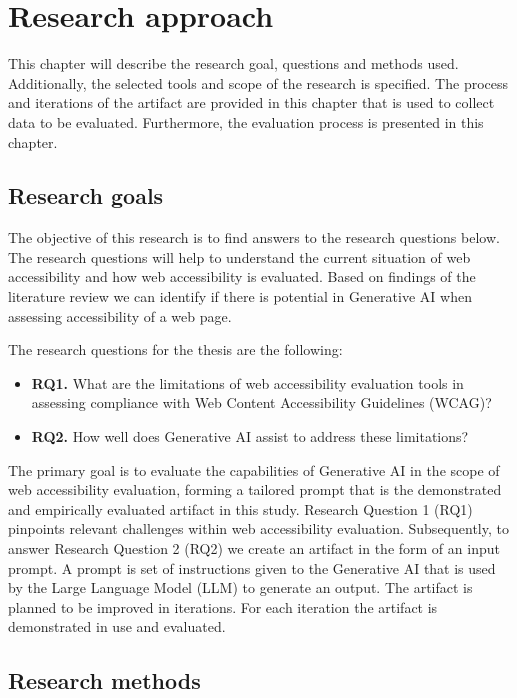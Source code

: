 \chapter{Research approach\label{methods}}

This chapter will describe the research goal, questions and methods used. Additionally, the selected tools and scope of the research is specified. The process and iterations of the artifact are provided in this chapter that is used to collect data to be evaluated. Furthermore, the evaluation process is presented in this chapter.

\section{Research goals}

The objective of this research is to find answers to the research questions below. The research questions will help to understand the current situation of web accessibility and how web accessibility is evaluated. Based on findings of the literature review we can identify if there is potential in Generative AI when assessing accessibility of a web page. 

The research questions for the thesis are the following:

\begin{itemize}
    \item \textbf{RQ1.} What are the limitations of web accessibility evaluation tools in assessing compliance with Web Content Accessibility Guidelines (WCAG)?
    \item \textbf{RQ2.} How well does Generative AI assist to address these limitations?
\end{itemize}

The primary goal is to evaluate the capabilities of Generative AI in the scope of web accessibility evaluation, forming a tailored prompt that is the demonstrated and empirically evaluated artifact in this study. Research Question 1 (RQ1) pinpoints relevant challenges within web accessibility evaluation. Subsequently, to answer Research Question 2 (RQ2) we create an artifact in the form of an input prompt. A prompt is set of instructions given to the Generative AI that is used by the Large Language Model (LLM) to generate an output. The artifact is planned to be improved in iterations. For each iteration the artifact is demonstrated in use and evaluated.

\section{Research methods}

